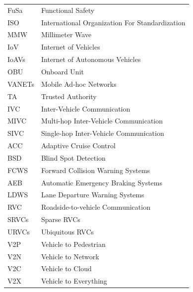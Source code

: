 \documentclass[a4paper,12pt]{article}
\begin{document}
\begin{center}
\begin{longtable}{|l|l|}
FuSa & Functional Safety\\

ISO & International Organization For Standardization\\

MMW & Millimeter Wave\\

IoV & Internet of Vehicles\\

IoAVs & Internet of Autonomous Vehicles\\

OBU & Onboard Unit\\

VANETs & Mobile Ad-hoc Networks\\

TA & Trusted Authority\\

IVC & Inter-Vehicle Communication\\

MIVC & Multi-hop Inter-Vehicle Communication\\

SIVC & Single-hop Inter-Vehicle Communication\\

ACC & Adaptive Cruise Control\\

BSD & Blind Spot Detection\\

FCWS & Forward Collision Warning Systems\\

AEB & Automatic Emergency Braking Systems\\

LDWS & Lane Departure Warning Systems\\

RVC & Roadside-to-vehicle Communication \\

SRVCs & Sparse RVCs\\

URVCs & Ubiquitous RVCs\\

V2P & Vehicle to Pedestrian \\

V2N & Vehicle to Network \\

V2C & Vehicle to Cloud \\

V2X & Vehicle to Everything \\


\end{longtable}
\end{center}
\end{document}
